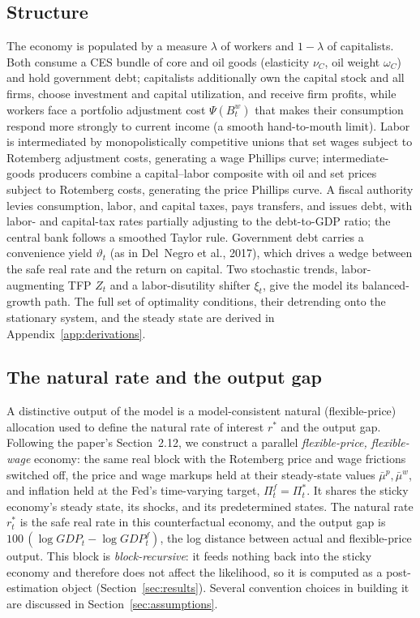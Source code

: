\documentclass[11pt]{article}
\theoremstyle{definition}
\newcommand{\rstar}{r^{*}}
\begin{document}
\subsection{Structure}
The economy is populated by a measure $\lambda$ of workers and $1-\lambda$ of capitalists. Both
consume a CES bundle of core and oil goods (elasticity $\nu_C$, oil weight $\omega_C$) and hold
government debt; capitalists additionally own the capital stock and all firms, choose investment and
capital utilization, and receive firm profits, while workers face a portfolio adjustment cost
$\Psi(B^w_t)$ that makes their consumption respond more strongly to current income (a smooth
hand-to-mouth limit). Labor is intermediated by monopolistically competitive unions that set wages
subject to Rotemberg adjustment costs, generating a wage Phillips curve; intermediate-goods producers
combine a capital--labor composite with oil and set prices subject to Rotemberg costs, generating the
price Phillips curve. A fiscal authority levies consumption, labor, and capital taxes, pays transfers,
and issues debt, with labor- and capital-tax rates partially adjusting to the debt-to-GDP ratio; the
central bank follows a smoothed Taylor rule. Government debt carries a convenience yield $\vartheta_t$
(as in Del~Negro et al., 2017), which drives a wedge between the safe real rate and the return on
capital. Two stochastic trends, labor-augmenting TFP $Z_t$ and a labor-disutility shifter $\xi_t$,
give the model its balanced-growth path. The full set of optimality conditions, their detrending
onto the stationary system, and the steady state are derived in Appendix~\ref{app:derivations}.

\subsection{The natural rate and the output gap}
A distinctive output of the model is a model-consistent natural (flexible-price) allocation used to
define the natural rate of interest $\rstar$ and the output gap. Following the paper's Section~2.12, we
construct a parallel \emph{flexible-price, flexible-wage} economy: the same real block with the
Rotemberg price and wage frictions switched off, the price and wage markups held at their steady-state
values $\bar\mu^p,\bar\mu^w$, and inflation held at the Fed's time-varying target, $\Pi^f_t=\Pi^*_t$.
It shares the sticky economy's steady state, its shocks, and its predetermined states. The natural rate
$\rstar_t$ is the safe real rate in this counterfactual economy,
and the output gap is $100\,(\log GDP_t-\log GDP^{f}_t)$, the log distance between actual and
flexible-price output. This block is \emph{block-recursive}: it feeds nothing back into the sticky
economy and therefore does not affect the likelihood, so it is computed as a post-estimation object
(Section~\ref{sec:results}). Several convention choices in building it are discussed in
Section~\ref{sec:assumptions}.
\end{document}
